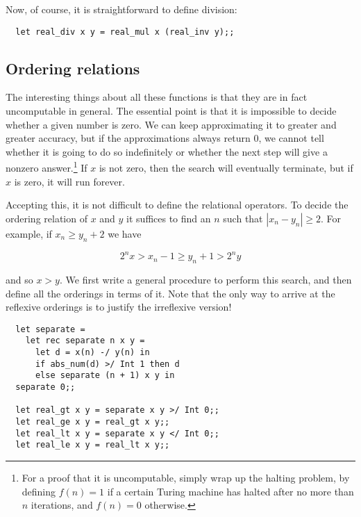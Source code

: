 \noindent Now, of course, it is straightforward to define division:

\begin{boxed}\begin{verbatim}
  let real_div x y = real_mul x (real_inv y);;
\end{verbatim}\end{boxed}

\subsection{Ordering relations}

The interesting things about all these functions is that they are in fact
uncomputable in general. The essential point is that it is impossible to decide
whether a given number is zero. We can keep approximating it to greater and
greater accuracy, but if the approximations always return $0$, we cannot tell
whether it is going to do so indefinitely or whether the next step will give a
nonzero answer.\footnote{For a proof that it is uncomputable, simply wrap up
the halting problem, by defining $f(n) = 1$ if a certain Turing machine has
halted after no more than $n$ iterations, and $f(n) = 0$ otherwise.} If $x$ is
not zero, then the search will eventually terminate, but if $x$ is zero, it
will run forever.

Accepting this, it is not difficult to define the relational operators. To
decide the ordering relation of $x$ and $y$ it suffices to find an $n$ such
that $|x_n - y_n| \geq 2$. For example, if $x_n \geq y_n + 2$ we have

$$ 2^n x > x_n - 1 \geq y_n + 1 > 2^n y $$

\noindent and so $x > y$. We first write a general procedure to perform this
search, and then define all the orderings in terms of it. Note that the only
way to arrive at the reflexive orderings is to justify the irreflexive version!

\begin{boxed}\begin{verbatim}
  let separate = 
    let rec separate n x y =
      let d = x(n) -/ y(n) in
      if abs_num(d) >/ Int 1 then d
      else separate (n + 1) x y in
  separate 0;;

  let real_gt x y = separate x y >/ Int 0;;
  let real_ge x y = real_gt x y;;
  let real_lt x y = separate x y </ Int 0;;
  let real_le x y = real_lt x y;;
\end{verbatim}\end{boxed}

